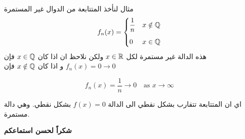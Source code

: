 	\begin{frame}
		\begin{exampleblock}{مثال}
			لنأخذ المتتابعة من الدوال غير المستمرة 
			\[
			f_n(x) = 
			\begin{cases}
				\dfrac{1}{n} & x\notin \mathbb{Q} \\[10pt]
				0 & x\in \mathbb{Q}
			\end{cases}
			\]
			هذه الدالة غير مستمرة لكل $x\in\mathbb{R}$ ولكن نلاحظ ان اذا كان $x\in\mathbb{Q}$ فإن 
			$f_n(x) = 0 \to 0$
			و اذا كان $x\notin \mathbb{Q}$ فإن 
			\begin{english}
				\[
				f_n(x) = \frac{1}{n} \to 0 \quad \text{as $x\to \infty$}
				\]
			\end{english}
			اي ان المتتابعة تتقارب بشكل نقطي الى الدالة $f(x) = 0 $ بشكل نقطي. وهي دالة مستمرة.
		\end{exampleblock}
	\end{frame}
	
	\begin{frame}
		\Huge
		\begin{center}
\textbf{شكراً لحسن استماعكم}
		\end{center}
	\end{frame}
